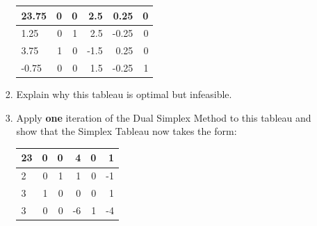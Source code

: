 \documentclass[12pt]{article}
\begin{document}
\begin{itemize}
\begin{enumerate}[(i)]
\begin{enumerate}
					\begin{center}
						\begin{tabular}[h]{|l|rrrrr|}\hline
							23.75     &        0            & 0&          2.5&          0.25&0\\\hline
							1.25&             0&          1&          2.5&         -0.25&0\\
							3.75&          1&             0&         -1.5&          0.25&0\\
							-0.75&0&0&1.5 &-0.25&1\\ \hline
						\end{tabular}
					\end{center}
					
					\item Explain why this tableau is optimal but infeasible.
					\item Apply {\bf one} iteration of the Dual Simplex Method to this tableau and show that  the  Simplex Tableau now takes the form:
					\begin{center}
						\begin{tabular}[h]{|l|rrrrr|}\hline
							23            & 0 &            0 &         4         &    0&          1\\ \hline
							2    &         0 &         1&          1       &      0&         -1\\
							3     &     1  &           0 &            0&             0  &        1\\
							3      &       0   &          0     &    -6&          1   &      -4\\\hline
						\end{tabular}
					\end{center}
					\smallskip
					

\end{enumerate}
\end{enumerate}
\end{itemize}
\end{document}

